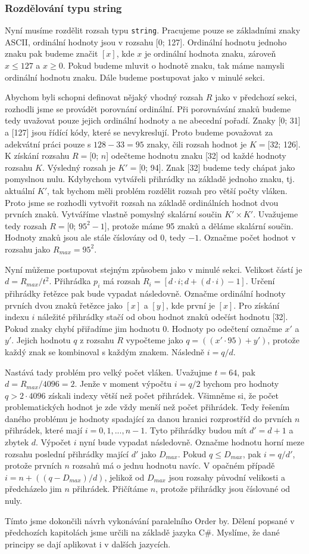 \subsubsection{Rozdělování typu string}

Nyní musíme rozdělit rozsah typu \texttt{string}.
Pracujeme pouze se základními znaky ASCII, ordinální hodnoty jsou v rozsahu [0; 127].
Ordinální hodnotu jednoho znaku pak budeme značit $[x]$, kde $x$ je ordinální hodnota znaku, zároveň $x\leq 127$ a $x\geq 0$.
Pokud budeme mluvit o hodnotě znaku, tak máme namysli ordinální hodnotu znaku.
Dále budeme postupovat jako v minulé sekci.

Abychom byli schopni definovat nějaký vhodný rozsah $R$ jako v předchozí sekci, rozhodli jsme se provádět porovnání ordinální.
Při porovnávání znaků budeme tedy uvažovat pouze jejich ordinální hodnoty a ne abecední pořadí.
Znaky [0; 31] a [127] jsou řídící kódy, které se nevykreslují.
Proto budeme považovat za adekvátní práci pouze s $128-33=95$ znaky, čili rozsah hodnot je $K=[$32; 126].
K získání rozsahu $R=[$0; $n$] odečteme hodnotu znaku [32] od každé hodnoty rozsahu $K$.
Výsledný rozsah je  $K'=[$0; 94].
Znak [32] budeme tedy chápat jako pomyslnou nulu.
Kdybychom vytvářeli přihrádky na základě jednoho znaku, tj. aktuální $K'$, tak bychom měli problém rozdělit rozsah pro větší počty vláken.
Proto jsme se rozhodli vytvořit rozsah na základě ordinálních hodnot dvou prvních znaků.
Vytváříme vlastně pomyslný skalární součin $K' \times K'$.
Uvažujeme tedy rozsah $R=[$0; $95^2-1]$, protože máme 95 znaků a děláme skalární součin.
Hodnoty znaků jsou ale stále číslovány od 0, tedy $-1$.
Označme počet hodnot v rozsahu jako $R_{max}=95^2$.

Nyní můžeme postupovat stejným způsobem jako v minulé sekci.
Velikost částí je $d=R_{max}/t^2$.
Přihrádka $p_i$ má rozsah $R_i=[d \cdot i; d+(d \cdot i)-1]$.
Určení přihrádky řetězce pak bude vypadat následovně.
Označme ordinální hodnoty prvních dvou znaků řetězce jako $[x]$ a $[y]$, kde první je $[x]$.
Pro získání indexu $i$ náležité přihrádky stačí od obou hodnot znaků odečíst hodnotu [32].
Pokud znaky chybí přiřadíme jim hodnotu 0.  
Hodnoty po odečtení označme $x'$ a $y'$.
Jejich hodnotu $q$ z rozsahu $R$ vypočteme jako $q=((x' \cdot 95)+y')$, protože každý znak se kombinoval s každým znakem.
Následně $i=q/d$.

Nastává tady problém pro velký počet vláken.
Uvažujme $t=64$, pak $d=R_{max}/4096=2$.
Jenže v moment výpočtu $i=q/2$ bychom pro hodnoty $q>2 \cdot 4096$ získali indexy větší než počet přihrádek.  
Všimněme si, že počet problematických hodnot je zde vždy menší než počet přihrádek.
Tedy řešením daného problému je hodnoty spadající za danou hranici rozprostříd do prvních $n$ přihrádek, které mají $i=0, 1, ..., n-1$.
Tyto přihrádky budou mít $d'=d+1$ a zbytek $d$.
Výpočet $i$ nyní bude vypadat následovně.
Označme hodnotu horní meze rozsahu poslední přihrádky mající $d'$ jako $D_{max}$.
Pokud $q\leq D_{max}$, pak $i=q/d'$, protože prvních $n$ rozsahů má o jednu hodnotu navíc.
V opačném případě $i=n+((q-D_{max})/d)$, jelikož od $D_{max}$ jsou rozsahy původní velikosti a předcházelo jim $n$ přihrádek.
Přičítáme $n$, protože přihrádky jsou číslované od nuly.

\smallskip
Tímto jsme dokončili návrh vykonávání paralelního Order by.
Dělení popsané v předchozích kapitolách jsme určili na základě jazyka C\#.
Myslíme, že dané principy se dají aplikovat i v dalších jazycích.


